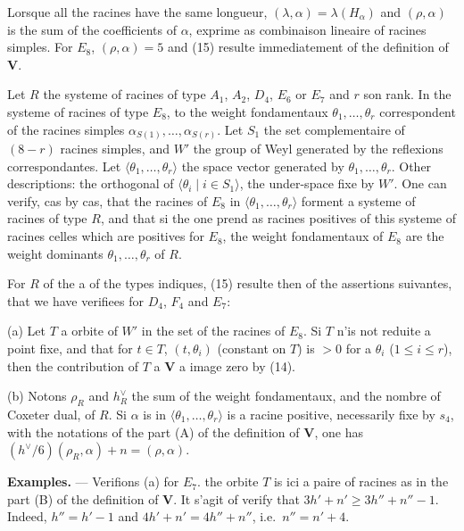 \documentclass[11pt,a4paper]{article}
\theoremstyle{plain}
\theoremstyle{definition}
\begin{document}
Lorsque all the racines have the same longueur, $(\lambda, \alpha) = \lambda(H_\alpha)$ and $(\rho,\alpha)$ is the sum of the coefficients of $\alpha$, exprime as combinaison lineaire of racines simples. For $E_8$, $(\rho,\alpha) = 5$ and (15) resulte immediatement of the definition of $\mathbf{V}$.

Let $R$ the systeme of racines of type $A_1$, $A_2$, $D_4$, $E_6$ or $E_7$ and $r$ son rank. In the systeme of racines of type $E_8$, to the weight fondamentaux $\theta_1,\dots,\theta_r$ correspondent of the racines simples $\alpha_{S(1)},\dots,\alpha_{S(r)}$. Let $S_1$ the set complementaire of $(8-r)$ racines simples, and $W'$ the group of Weyl generated by the reflexions correspondantes. Let $\langle \theta_1,\dots,\theta_r \rangle$ the space vector generated by $\theta_1,\dots,\theta_r$. Other descriptions: the orthogonal of $\langle \theta_i \mid i \in S_1 \rangle$, the under-space fixe by $W'$. One can verify, cas by cas, that the racines of $E_8$ in $\langle \theta_1,\dots,\theta_r \rangle$ forment a systeme of racines of type $R$, and that si the one prend as racines positives of this systeme of racines celles which are positives for $E_8$, the weight fondamentaux of $E_8$ are the weight dominants $\theta_1,\dots,\theta_r$ of $R$.

For $R$ of the a of the types indiques, (15) resulte then of the assertions suivantes, that we have verifiees for $D_4$, $F_4$ and $E_7$:

(a) Let $T$ a orbite of $W'$ in the set of the racines of $E_8$. Si $T$ n'is not reduite a point fixe, and that for $t \in T$, $(t,\theta_i)$ (constant on $T$) is $> 0$ for a $\theta_i$ ($1 \leq i \leq r$), then the contribution of $T$ a $\mathbf{V}$ a image zero by (14).

(b) Notons $\rho_R$ and $h_R^\vee$ the sum of the weight fondamentaux, and the nombre of Coxeter dual, of $R$. Si $\alpha$ is in $\langle \theta_1,\dots,\theta_r \rangle$ is a racine positive, necessarily fixe by $s_4$, with the notations of the part (A) of the definition of $\mathbf{V}$, one has $(h^\vee/6)(\rho_R,\alpha) + n = (\rho,\alpha)$.

\smallskip

\textbf{Examples.} --- Verifions (a) for $E_7$. the orbite $T$ is ici a paire of racines as in the part (B) of the definition of $\mathbf{V}$. It s'agit of verify that $3h' + n' \geq 3h'' + n'' - 1$. Indeed, $h'' = h' - 1$ and $4h' + n' = 4h'' + n''$, i.e.\ $n'' = n' + 4$.

\smallskip
\end{document}
